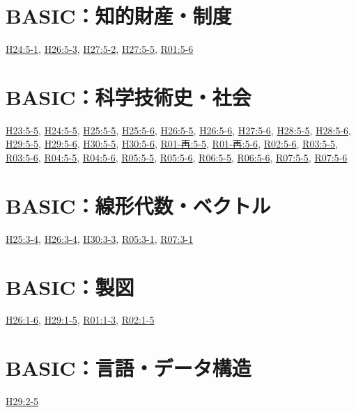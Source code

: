 \section{BASIC：知的財産・制度}
\hyperref[q:h24-reg-basic-5-1]{H24:5-1}, \hyperref[q:h26-reg-basic-5-3]{H26:5-3}, \hyperref[q:h27-reg-basic-5-2]{H27:5-2}, \hyperref[q:h27-reg-basic-5-5]{H27:5-5}, \hyperref[q:r01-reg-basic-5-6]{R01:5-6}
\section{BASIC：科学技術史・社会}
\hyperref[q:h23-reg-basic-5-5]{H23:5-5}, \hyperref[q:h24-reg-basic-5-5]{H24:5-5}, \hyperref[q:h25-reg-basic-5-5]{H25:5-5}, \hyperref[q:h25-reg-basic-5-6]{H25:5-6}, \hyperref[q:h26-reg-basic-5-5]{H26:5-5}, \hyperref[q:h26-reg-basic-5-6]{H26:5-6}, \hyperref[q:h27-reg-basic-5-6]{H27:5-6}, \hyperref[q:h28-reg-basic-5-5]{H28:5-5}, \hyperref[q:h28-reg-basic-5-6]{H28:5-6}, \hyperref[q:h29-reg-basic-5-5]{H29:5-5}, \hyperref[q:h29-reg-basic-5-6]{H29:5-6}, \hyperref[q:h30-reg-basic-5-5]{H30:5-5}, \hyperref[q:h30-reg-basic-5-6]{H30:5-6}, \hyperref[q:r01-ret-basic-5-5]{R01-再:5-5}, \hyperref[q:r01-ret-basic-5-6]{R01-再:5-6}, \hyperref[q:r02-reg-basic-5-6]{R02:5-6}, \hyperref[q:r03-reg-basic-5-5]{R03:5-5}, \hyperref[q:r03-reg-basic-5-6]{R03:5-6}, \hyperref[q:r04-reg-basic-5-5]{R04:5-5}, \hyperref[q:r04-reg-basic-5-6]{R04:5-6}, \hyperref[q:r05-reg-basic-5-5]{R05:5-5}, \hyperref[q:r05-reg-basic-5-6]{R05:5-6}, \hyperref[q:r06-reg-basic-5-5]{R06:5-5}, \hyperref[q:r06-reg-basic-5-6]{R06:5-6}, \hyperref[q:r07-reg-basic-5-5]{R07:5-5}, \hyperref[q:r07-reg-basic-5-6]{R07:5-6}
\section{BASIC：線形代数・ベクトル}
\hyperref[q:h25-reg-basic-3-4]{H25:3-4}, \hyperref[q:h26-reg-basic-3-4]{H26:3-4}, \hyperref[q:h30-reg-basic-3-3]{H30:3-3}, \hyperref[q:r05-reg-basic-3-1]{R05:3-1}, \hyperref[q:r07-reg-basic-3-1]{R07:3-1}
\section{BASIC：製図}
\hyperref[q:h26-reg-basic-1-6]{H26:1-6}, \hyperref[q:h29-reg-basic-1-5]{H29:1-5}, \hyperref[q:r01-reg-basic-1-3]{R01:1-3}, \hyperref[q:r02-reg-basic-1-5]{R02:1-5}
\section{BASIC：言語・データ構造}
\hyperref[q:h29-reg-basic-2-5]{H29:2-5}
